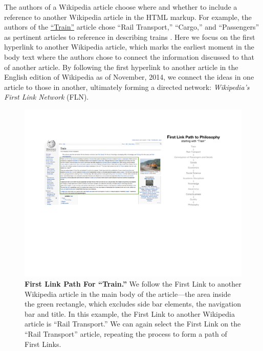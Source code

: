 \documentclass[pre,twocolumn,twoside,superscriptaddress,floatfix, aps, 10pt]{revtex4-1}
\begin{document}
The authors of a Wikipedia article choose where and whether to include a 
reference to another Wikipedia article
in the HTML markup.
For example, the authors of the 
\href{https://en.wikipedia.org/wiki/Train}{``Train''}
article chose
``Rail Transport,'' ``Cargo,'' and ``Passengers'' 
as pertinent articles to reference in describing trains
\cite{wiki_train}
.
Here we focus on the first hyperlink to another Wikipedia article, which 
marks the earliest moment in the body text where the authors
chose to connect the information discussed to that of another article.
By following the first hyperlink to another article in the English edition of
Wikipedia as of November, 2014, we connect the ideas in one article to those in another, ultimately forming a directed network: 
{\it Wikipedia's First Link Network} (FLN).

\begin{figure}[tp!]
  \includegraphics[width=\textwidth]{graphics/Train.pdf}  
  \caption{
    \textbf{First Link Path For ``Train.''}
    We follow the First Link to another Wikipedia article
    in the main body of the article---the area
    inside the green rectangle, which excludes 
    side bar elements, the navigation bar and title. 
    In this example, the First Link to another Wikipedia article is ``Rail Transport.'' 
    We can again select the First Link on the ``Rail Transport''
    article, repeating the process to 
    form a path of First Links.
  }
  \label{fig:Train First Links}
\end{figure}
\end{document}
